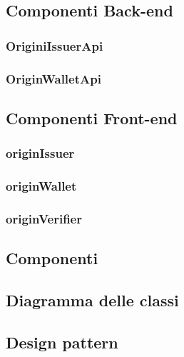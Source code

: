 \subsection{Componenti Back-end}
\subsubsection{OriginiIssuerApi}
\subsubsection{OriginWalletApi}

\subsection{Componenti Front-end}
\subsubsection{originIssuer} 
\subsubsection{originWallet}
\subsubsection{originVerifier}

\subsection{Componenti}


\subsection{Diagramma delle classi}

\subsection{Design pattern}

